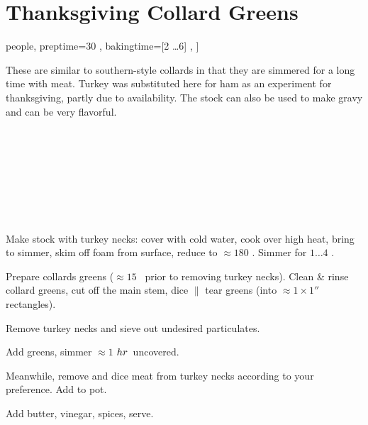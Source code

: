 \section[Collard Greens]{Thanksgiving Collard Greens}

\begin{recipestats}[
        servings=[4 \ldots 6] people,
        preptime=30 \minute,
        bakingtime=[2 \ldots 6] \hour,
    ]
\end{recipestats}

\begin{recipeabstract}
    These are similar to southern-style collards in that they are simmered for a long time with meat.
    Turkey was substituted here for ham as an experiment for thanksgiving, partly due to availability.
    The stock can also be used to make gravy and can be very flavorful.
\end{recipeabstract}

\begin{ingredientcolumns}
    \begin{ingredientblock}
        \\
        \\
        \\
    \end{ingredientblock}
    \begin{ingredientblock}
        \\
        \\
        \\
    \end{ingredientblock}
\end{ingredientcolumns}

\begin{preparation}
\item Make stock with turkey necks: cover with cold water, cook over high heat, bring to simmer, skim off
    foam from surface, reduce to $\approx 180$ \Fahrenheit. Simmer for $1 \ldots 4$ \hour.

\item Prepare collards greens ($\approx 15$ \minute~prior to removing turkey necks).
    Clean \& rinse collard greens, cut off the main stem, dice $\|$ tear greens (into $\approx 1\times1''$ rectangles).

\item Remove turkey necks and sieve out undesired particulates.

\item Add greens, simmer $\approx 1$ $\hour$~uncovered.

\item Meanwhile, remove and dice meat from turkey necks according to your preference. Add to pot.

\item Add butter, vinegar, spices, serve.
\end{preparation}

